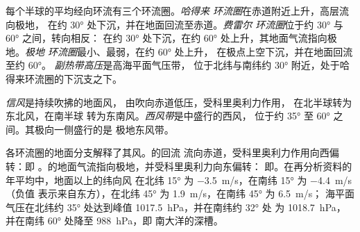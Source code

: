 \begin{definition}\label{def:b1:atmospheric-circulation:cells}
每个半球的平均经向环流有三个环流圈。\emph{哈得来
环流圈}在赤道附近上升，高层流向极地，
在约 \ang{30} 处下沉，并在地面回流至赤道。\emph{费雷尔
环流圈}位于约 \ang{30} 与 \ang{60} 之间，转向相反：
在约 \ang{30} 处下沉，在约 \ang{60} 处上升，其地面气流指向极地。\emph{极地
环流圈}最小、最弱，在约 \ang{60} 处上升，
在极点上空下沉，并在地面回流至约 \ang{60}。
\emph{副热带高压}是高海平面气压带，
位于北纬与南纬约 \ang{30} 附近，处于哈得来环流圈的下沉支之下。
\end{definition}

\begin{definition}[信风、西风带]\label{def:b1:atmospheric-circulation:winds}
\emph{信风}是持续吹拂的地面风，
由吹向赤道低压，受科里奥利力作用，
在北半球转为东北风，在南半球
转为东南风。\emph{西风带}是中盛行的西风，
位于约 \ang{35} 至 \ang{60} 之间。其极向一侧盛行的是
极地东风带。
\end{definition}

各环流圈的地面分支解释了其风。的回流
流向赤道，受科里奥利力作用向西偏转：即
。的地面气流指向极地，并受科里奥利力向东偏转：
即。在再分析资料的年平均中，地面以上的纬向风
在北纬 \ang{15} 为 \qty{-3.5}{m/s}，在南纬 \ang{15} 为 \qty{-4.4}{m/s}（负值
表示来自东方），在北纬 \ang{45} 为 \qty{+1.9}{m/s}，在南纬 \ang{45} 为 \qty{+6.5}{m/s}；
海平面气压在北纬约 \ang{35} 处达到峰值 \qty{1017.5}{hPa}，并在南纬约 \ang{32} 处
为 \qty{1018.7}{hPa}，并在南纬 \ang{60} 处降至 \qty{988}{hPa}，即
南大洋的深槽。

